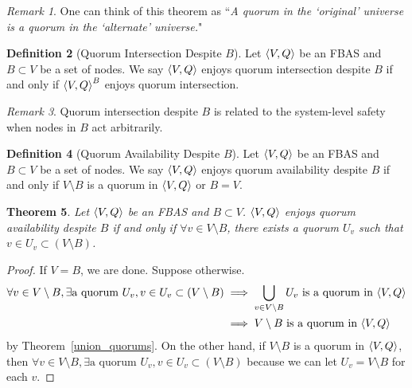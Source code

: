 \documentclass[12pt, psamsfonts]{amsart}
\newtheorem{thm}{Theorem}[subsection]
\theoremstyle{definition}
\newtheorem{defn}[thm]{Definition}
\theoremstyle{remark}
\newtheorem{rem}[thm]{Remark}
\numberwithin{equation}{subsection}
\begin{document}
\begin{rem}
    One can think of this theorem as ``\textit{A quorum in the `original' universe is a quorum in the `alternate' universe.}"
\end{rem}

\begin{defn}[Quorum Intersection Despite $B$]
    Let $\ev{V, Q}$ be an FBAS and $B \subset V$ be a set of nodes.
    We say $\ev{V, Q}$ enjoys quorum intersection despite $B$ if and only if $\ev{V, Q}^B$ enjoys quorum intersection.
\end{defn}

\begin{rem}
    Quorum intersection despite $B$ is related to the system-level safety when nodes in $B$ act arbitrarily.
\end{rem}

\begin{defn}[Quorum Availability Despite $B$]\label{def_quorum_availability}
    Let $\ev{V, Q}$ be an FBAS and $B \subset V$ be a set of nodes.
    We say $\ev{V, Q}$ enjoys quorum availability despite $B$ if and only if $V \setminus B$ is a quorum in $\ev{V, Q}$ or $B = V$.
\end{defn}

\begin{thm}\label{quorum_availability_equivalence_condition}
    Let $\ev{V, Q}$ be an FBAS and $B \subset V$.
    $\ev{V, Q}$ enjoys quorum availability despite $B$ if and only if $\forall v \in V \setminus B$, there exists a quorum $U_v$ such that $v \in U_v \subset (V \setminus B)$.
\end{thm}

\begin{proof}
    If $V = B$, we are done.
    Suppose otherwise.
    \begin{align*}
        \forall v \in V \setminus B, \exists \text{a quorum $U_v$}, v \in U_v \subset (V \setminus B)
            &\implies \bigcup_{v \in V \setminus B} U_v \text{ is a quorum in $\ev{V, Q}$} \\
            &\implies \text{$V \setminus B$ is a quorum in $\ev{V, Q}$}
    \end{align*}
    by Theorem~\ref{union_quorums}.
    On the other hand, if $V \setminus B$ is a quorum in $\ev{V, Q}$, then $\forall v \in V \setminus B, \exists \text{a quorum $U_v$}, v \in U_v \subset (V \setminus B)$ because we can let $U_v = V \setminus B$ for each $v$.
\end{proof}
\end{document}
